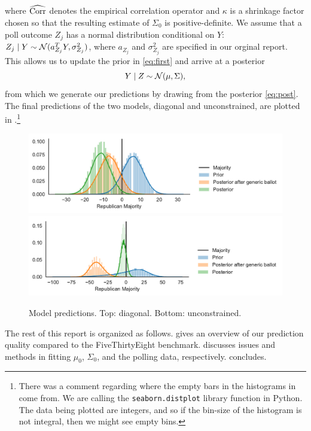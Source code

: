 \documentclass[12pt]{article}
\newcommand{\cm}{{\color{Red}{\textsf{[C]}}}}
\begin{document}
where $\widehat{\operatorname{Corr}}$ denotes the empirical correlation operator and $\kappa$ is a shrinkage factor chosen so that the resulting estimate of $\Sigma_0$ is positive-definite. We assume that a poll outcome $Z_j$ has a normal distribution conditional on $Y$: $Z_j \mid Y \sim \mathcal{N}(a_{Z_j}^T Y, \sigma_{Z_j}^2)$, where $a_{Z_j}$ and $\sigma_{Z_j}^2$ are specified in our orginal report. This allows us to update the prior in \eqref{eq:first} and arrive at a posterior \begin{equation}
  Y \mid Z \sim \mathcal{N}(\mu, \Sigma),
  \label{eq:post}
\end{equation}
from which we generate our predictions by drawing from the posterior \eqref{eq:post}. The final predictions of the two models, diagonal and unconstrained, are plotted in .\footnote{\cm{} There was a comment regarding where the empty bars in the histograms in  come from. We are calling the \texttt{seaborn.distplot} library function in Python. The data being plotted are integers, and so if the bin-size of the histogram is not integral, then we might see empty bins. }
\begin{figure}[tb]
  \centering
  \includegraphics[width=.7\textwidth]{rep_seats_with_diagonal_prior.pdf}
  \includegraphics[width=.7\textwidth]{rep_seats.pdf}
  \caption{Model predictions. Top: diagonal. Bottom: unconstrained. }
  \label{fig:model}
\end{figure}

The rest of this report is organized as follows.  gives an overview of our prediction quality compared to the FiveThirtyEight benchmark.  discusses issues and methods in fitting $\mu_0$, $\Sigma_0$, and the polling data, respectively.  concludes.
\end{document}
